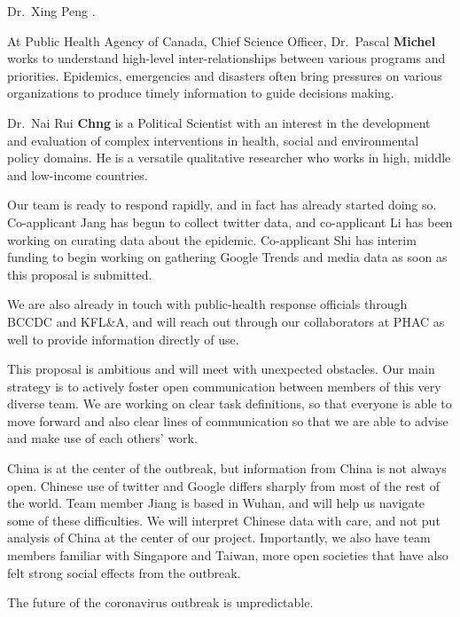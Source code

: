 Dr.\ Xing Peng  .

At Public Health Agency of Canada, Chief Science Officer, Dr.\ Pascal \textbf{Michel} works to understand high-level inter-relationships between various programs and priorities. Epidemics, emergencies and disasters often bring pressures on various organizations to produce timely information to guide decisions making. 

Dr.\ Nai Rui \textbf{Chng} is a Political Scientist with an interest in the development and evaluation of complex interventions in health, social and environmental policy domains. He is a versatile qualitative researcher who works in high, middle and low-income countries.

Our team is ready to respond rapidly, and in fact has already started doing so. Co-applicant Jang has begun to collect twitter data, and co-applicant Li has been working on curating data about the epidemic. Co-applicant Shi has interim funding to begin working on gathering Google Trends and media data as soon as this proposal is submitted.

We are also already in touch with public-health response officials through BCCDC and KFL\&A, and will reach out through our collaborators at PHAC as well to provide information directly of use.


This proposal is ambitious and will meet with unexpected obstacles. Our main strategy is to actively foster open communication between members of this very diverse team. We are working on clear task definitions, so that everyone is able to move forward and also clear lines of communication so that we are able to advise and make use of each others' work.

China is at the center of the outbreak, but information from China is not always open. Chinese use of twitter and Google differs sharply from most of the rest of the world. Team member Jiang is based in Wuhan, and will help us navigate some of these difficulties. We will interpret Chinese data with care, and not put analysis of China at the center of our project. Importantly, we also have team members familiar with Singapore and Taiwan, more open societies that have also felt strong social effects from the outbreak.

The future of the coronavirus outbreak is unpredictable. 
